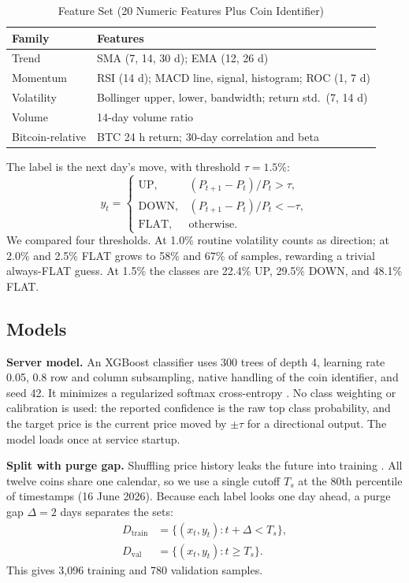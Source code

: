 \documentclass[conference]{IEEEtran}
\begin{document}
\begin{table}[t]
\caption{Feature Set (20 Numeric Features Plus Coin Identifier)}
\label{tab:features}
\centering
\begin{tabular}{p{}p{}}
\toprule
\textbf{Family} & \textbf{Features}\\
\midrule
Trend & SMA (7, 14, 30 d); EMA (12, 26 d)\\
Momentum & RSI (14 d); MACD line, signal, histogram; ROC (1, 7 d)\\
Volatility & Bollinger upper, lower, bandwidth; return std.\ (7, 14 d)\\
Volume & 14-day volume ratio\\
Bitcoin-relative & BTC 24 h return; 30-day correlation and beta\\
\bottomrule
\end{tabular}
\end{table}

The label is the next day's move, with threshold $\tau=1.5\%$:
\begin{equation}
y_t=\begin{cases}
\mathrm{UP}, & (P_{t+1}-P_t)/P_t>\tau,\\
\mathrm{DOWN}, & (P_{t+1}-P_t)/P_t<-\tau,\\
\mathrm{FLAT}, & \text{otherwise.}
\end{cases}
\end{equation}
We compared four thresholds. At 1.0\% routine volatility counts as direction; at 2.0\% and 2.5\% FLAT grows to 58\% and 67\% of samples, rewarding a trivial always-FLAT guess. At 1.5\% the classes are 22.4\% UP, 29.5\% DOWN, and 48.1\% FLAT.

\subsection{Models}
\textbf{Server model.} An XGBoost classifier uses 300 trees of depth 4, learning rate 0.05, 0.8 row and column subsampling, native handling of the coin identifier, and seed 42. It minimizes a regularized softmax cross-entropy \cite{chen2016}. No class weighting or calibration is used: the reported confidence is the raw top class probability, and the target price is the current price moved by $\pm\tau$ for a directional output. The model loads once at service startup.

\textbf{Split with purge gap.} Shuffling price history leaks the future into training \cite{bergmeir2012,lopez2018}. All twelve coins share one calendar, so we use a single cutoff $T_s$ at the 80th percentile of timestamps (16 June 2026). Because each label looks one day ahead, a purge gap $\Delta=2$ days separates the sets:
\begin{equation}
\begin{aligned}
D_{\mathrm{train}}&=\{(x_t,y_t):t+\Delta<T_s\},\\
D_{\mathrm{val}}&=\{(x_t,y_t):t\geq T_s\}.
\end{aligned}
\label{eq:split}
\end{equation}
This gives 3,096 training and 780 validation samples.
\end{document}
